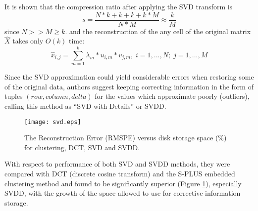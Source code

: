 It is shown that the compression ratio after applying the SVD transform is 
\begin{equation}
s = \frac{N*k + k + k + k*M}{N*M} \approx \frac{k}{M}
\label{eq:svd_compression}
\end{equation}
since $N >> M \geq k$. and the reconstruction of the any cell of the original matrix $\hat{X}$ takes only $O(k)$ time:
\begin{equation}
\hat{x}_{i,j}  = \sum_{m=1}^{k} \lambda_{m} * u_{i,m} * v_{j,m},\; i=1,...,N;\; j=1,...,M
\label{eq:svd_reconstruct}
\end{equation}

Since the SVD approximation could yield considerable errors when restoring some of the original data, authors suggest keeping correcting information in the form of tuples $(row,column,delta)$ for the values which approximate poorly (outliers), calling this method as ``SVD with Details'' or SVDD. 

\begin{figure}[tbp]
   \centering
   \texttt{[image: svd.eps]}
   \caption{The Reconstruction Error (RMSPE) versus disk storage space (\%) for clustering, DCT, SVD and SVDD.}
   \label{fig:svd_benchmark}
\end{figure} 

With respect to performance of both SVD and SVDD methods, they were compared with DCT (discrete cosine transform) and the S-PLUS embedded clustering method and found to be significantly superior (Figure  \ref{fig:svd_benchmark}), especially SVDD, with the growth of the space allowed to use for corrective information storage.